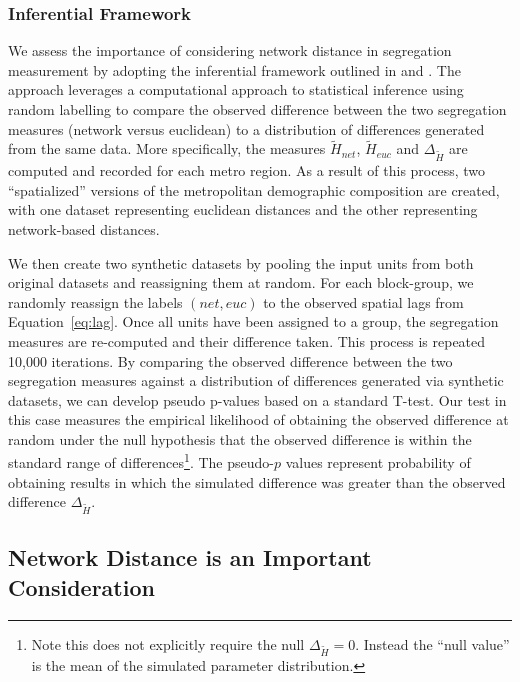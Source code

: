\documentclass[
  10pt,
]{article}
\begin{document}
\hypertarget{inferential-framework}{%
\subsubsection{Inferential Framework}\label{inferential-framework}}

We assess the importance of considering network distance in segregation
measurement by adopting the inferential framework outlined in
\citet{rey2021ComparativeSpatial} and
\citet{cortes2020OpensourceFramework}. The approach leverages a
computational approach to statistical inference using random labelling
to compare the observed difference between the two segregation measures
(network versus euclidean) to a distribution of differences generated
from the same data. More specifically, the measures \(\tilde{H}_{net}\),
\(\tilde{H}_{euc}\) and \(\Delta_{\tilde{H}}\) are computed and recorded
for each metro region. As a result of this process, two ``spatialized''
versions of the metropolitan demographic composition are created, with
one dataset representing euclidean distances and the other representing
network-based distances.

We then create two synthetic datasets by pooling the input units from
both original datasets and reassigning them at random. For each
block-group, we randomly reassign the labels \((net,euc)\) to the
observed spatial lags from Equation~\ref{eq:lag}. Once all units have
been assigned to a group, the segregation measures are re-computed and
their difference taken. This process is repeated 10,000 iterations. By
comparing the observed difference between the two segregation measures
against a distribution of differences generated via synthetic datasets,
we can develop pseudo p-values based on a standard T-test. Our test in
this case measures the empirical likelihood of obtaining the observed
difference at random under the null hypothesis that the observed
difference is within the standard range of differences\footnote{Note
  this does not explicitly require the null \(\Delta_{\tilde{H}}=0\).
  Instead the ``null value'' is the mean of the simulated parameter
  distribution.}. The pseudo-\(p\) values represent probability of
obtaining results in which the simulated difference was greater than the
observed difference \(\Delta_{\tilde{H}}\).

\hypertarget{network-distance-is-an-important-consideration}{%
\subsection{Network Distance is an Important
Consideration}\label{network-distance-is-an-important-consideration}}
\end{document}
